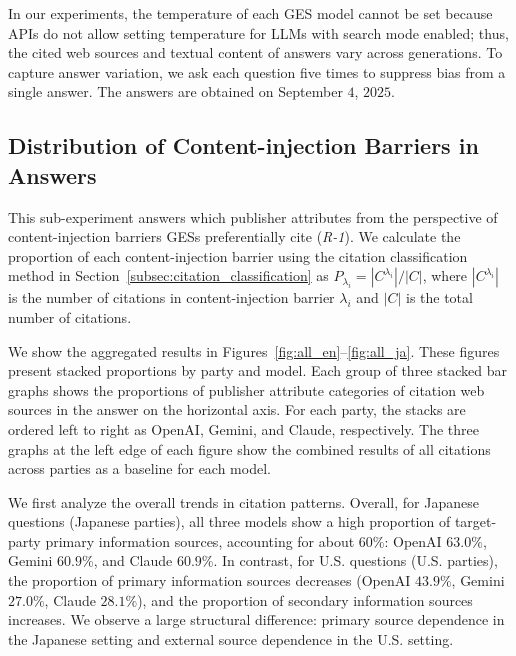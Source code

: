 In our experiments, the temperature of each GES model cannot be set because APIs do not allow setting temperature for LLMs with search mode enabled; thus, the cited web sources and textual content of answers vary across generations.
To capture answer variation, we ask each question five times to suppress bias from a single answer.
The answers are obtained on September \(4\), \(2025\).


\subsection{Distribution of Content-injection Barriers in Answers}
\label{sec:api_response}
This sub-experiment answers which publisher attributes from the perspective of content-injection barriers GESs preferentially cite (\emph{R-1}).
We calculate the proportion of each content-injection barrier using the citation classification method in Section~\ref{subsec:citation_classification} as \( P_{\lambda_i} = |C^{\lambda_i}|/|C| \), where \( |C^{\lambda_i}| \) is the number of citations in content-injection barrier \( \lambda_i \) and \( |C| \) is the total number of citations.

We show the aggregated results in Figures~\ref{fig:all_en}--\ref{fig:all_ja}.
These figures present stacked proportions by party and model.
Each group of three stacked bar graphs shows the proportions of publisher attribute categories of citation web sources in the answer on the horizontal axis.
For each party, the stacks are ordered left to right as OpenAI, Gemini, and Claude, respectively.
The three graphs at the left edge of each figure show the combined results of all citations across parties as a baseline for each model.

We first analyze the overall trends in citation patterns.
Overall, for Japanese questions (Japanese parties), all three models show a high proportion of target-party primary information sources, accounting for about \(60\%\): OpenAI \(63.0\%\), Gemini \(60.9\%\), and Claude \(60.9\%\).
In contrast, for U.S. questions (U.S. parties), the proportion of primary information sources decreases (OpenAI \(43.9\%\), Gemini \(27.0\%\), Claude \(28.1\%\)), and the proportion of secondary information sources increases.
We observe a large structural difference: primary source dependence in the Japanese setting and external source dependence in the U.S. setting.

